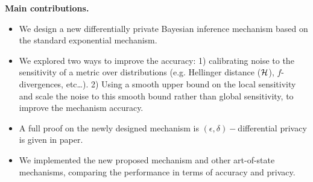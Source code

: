 \documentclass{article}
\begin{document}
\noindent \textbf{Main contributions.}
\begin{itemize}
	\item We design a new differentially private Bayesian inference mechanism based on the standard exponential mechanism.

	\item We explored two ways to improve the accuracy: 1) calibrating noise to the sensitivity of a metric over distributions (e.g. Hellinger distance ($\mathcal{H}$), $f$-divergences, etc\dots). 2) Using a smooth upper bound on the local sensitivity and scale the noise to this smooth bound rather than global sensitivity, to improve the mechanism accuracy.

  \item A full proof on the newly designed mechanism is $(\epsilon, \delta)-$differential privacy is given in paper.

	\item We implemented the new proposed mechanism and other art-of-state mechanisms, comparing the performance in terms of accuracy and privacy.
\end{itemize}
\end{document}
